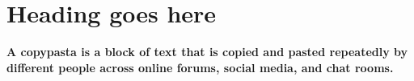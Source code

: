 \documentclass{article}
\begin{document}
\section{Heading goes here}
\textbf{A copypasta is a block of text that is copied and pasted repeatedly by different people across online forums, social media, and chat rooms.}
\end{document}
